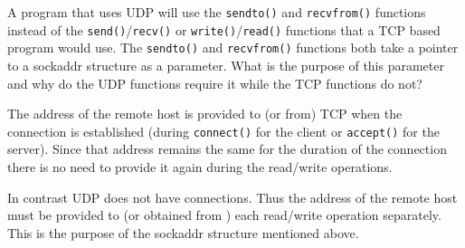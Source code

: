 \documentclass[12pt]{examdesign}
\begin{document}
\begin{shortanswer}

  \begin{question}
    A program that uses UDP will use the \texttt{sendto()} and \texttt{recvfrom()} functions
    instead of the \texttt{send()}/\texttt{recv()} or \texttt{write()}/\texttt{read()} functions
    that a TCP based program would use. The \texttt{sendto()} and \texttt{recvfrom()} functions
    both take a pointer to a sockaddr structure as a parameter. What is the purpose of this
    parameter and why do the UDP functions require it while the TCP functions do not?

    \begin{answer}
      The address of the remote host is provided to (or from) TCP when the connection is
      established (during \texttt{connect()} for the client or \texttt{accept()} for the
      server). Since that address remains the same for the duration of the connection there is
      no need to provide it again during the read/write operations.

      In contrast UDP does not have connections. Thus the address of the remote host must be
      provided to (or obtained from ) each read/write operation separately. This is the purpose
      of the sockaddr structure mentioned above.
    \end{answer}
  \end{question}

\end{shortanswer}
\end{document}

